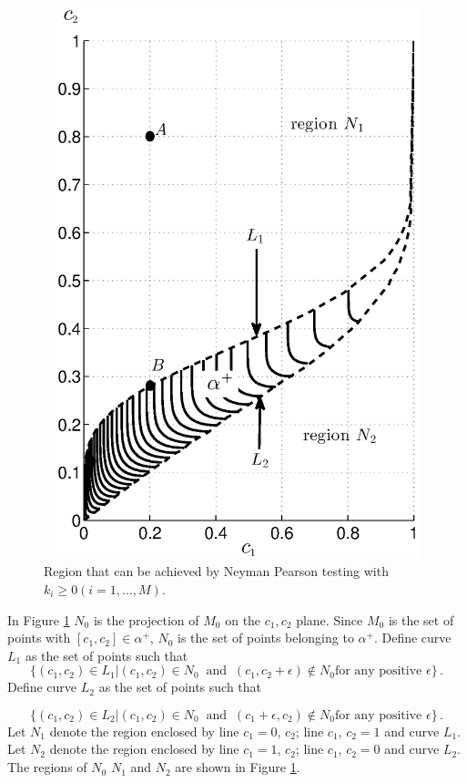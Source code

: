 \begin{figure}[!t]
\centering
\includegraphics[width=12cm, height = 16cm]{3/singlecontour.eps}
\caption{Region that can be achieved by Neyman Pearson testing with $k_i \geq 0 (i=1, ..., M)$.}
\label{pic: contour for m0 gaussian}
\end{figure}

In Figure \ref{pic: contour for m0 gaussian} $N_0$ is the projection of $M_0$ on the $c_1, c_2$ plane. Since $M_0$ is the set of points with $[c_1, c_2] \in \alpha^+$, $N_0$ is the set of points belonging to $\alpha^+$.
Define curve $L_1$ as the set of points such that 
\[
\{ (c_1, c_2) \in L_1 | (c_1, c_2) \in {N}_0 \;\;\text{and} \;\;(c_1, c_2+\epsilon)\notin {N}_0 \text{for any positive $\epsilon$} \}\,.
\]
Define curve $L_2$ as the set of points such that 

\[
\{ (c_1, c_2) \in L_2 | (c_1, c_2) \in {N}_0 \;\;\text{and} \;\;(c_1 + \epsilon, c_2)\notin {N}_0 \text{for any positive $\epsilon$} \}\,.
\]
Let $N_1$ denote the region enclosed by line $c_1 = 0$, $c_2$; line $c_1$, $c_2 = 1$ and curve $L_1$.
Let $N_2$ denote the region enclosed by line $c_1 = 1$, $c_2$; line $c_1$, $c_2 = 0$ and curve $L_2$.
The regions of $N_0$ $N_1$ and $N_2$ are shown in Figure \ref{pic: contour for m0 gaussian}.

